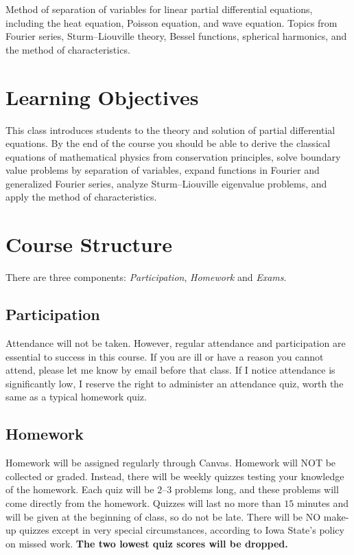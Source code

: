 \documentclass[11pt]{amsart}
\begin{document}
\begin{raggedright}
Method of separation of variables for linear partial
differential equations, including the heat equation, Poisson equation, and wave
equation.  Topics from Fourier series, Sturm--Liouville theory, Bessel functions,
spherical harmonics, and the method of characteristics.

\section{Learning Objectives}

This class introduces students to the theory and
solution of partial differential equations.  By the end of the course you should be
able to derive the classical equations of mathematical physics from conservation
principles, solve boundary value problems by separation of variables, expand functions
in Fourier and generalized Fourier series, analyze Sturm--Liouville eigenvalue
problems, and apply the method of characteristics.

\section{Course Structure}

There are three components: \emph{Participation},
\emph{Homework} and \emph{Exams}.

\subsection{Participation}

Attendance will not be taken.  However, regular attendance
and participation are essential to success in this course.  If you are ill or have a
reason you cannot attend, please let me know by email before that class.  If I notice
attendance is significantly low, I reserve the right to administer an attendance quiz,
worth the same as a typical homework quiz.

\subsection{Homework}

Homework will be assigned regularly through Canvas.  Homework will
NOT be collected or graded.  Instead, there will be weekly quizzes testing your
knowledge of the homework.  Each quiz will be $2$--$3$ problems long, and these
problems will come directly from the homework.  Quizzes will last no more than $15$
minutes and will be given at the beginning of class, so do not be late.  There will be
NO make-up quizzes except in very special circumstances, according to Iowa State's
policy on missed work.  \textbf{The two lowest quiz scores will be dropped.}


\end{raggedright}
\end{document}

